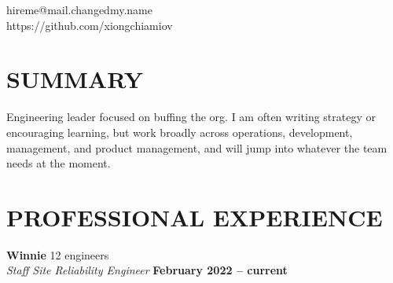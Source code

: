 \documentclass[margin,line]{resume}
\begin{document}
{
    \hfill hireme@mail.changedmy.name       \vspace{0mm}\\\vspace{0mm}%
    \hfill https://github.com/xiongchiamiov \vspace{0mm}\\\vspace{-9mm}%
}

\begin{resume}

    \vspace{-3mm}

    \section{\mysidestyle \textbf{\large{S}\small{UMMARY}}}

    Engineering leader focused on buffing the org.  I am often writing strategy or encouraging learning, but work broadly across operations, development, management, and product management, and will jump into whatever the team needs at the moment.

    \vspace{-1mm}

\sectionline

    \section{\mysidestyle \textbf{\large{P}\small{ROFESSIONAL} \large{E}\small{XPERIENCE}}}

    \textbf{\listing Winnie} \hfill {\selectfont\texttildelow}12 engineers
    \vspace{2mm}\\\vspace{1mm}%
    \textsl{Staff Site Reliability Engineer} \hfill \textbf{February 2022 -- current}\\
    

\end{resume}
\end{document}
